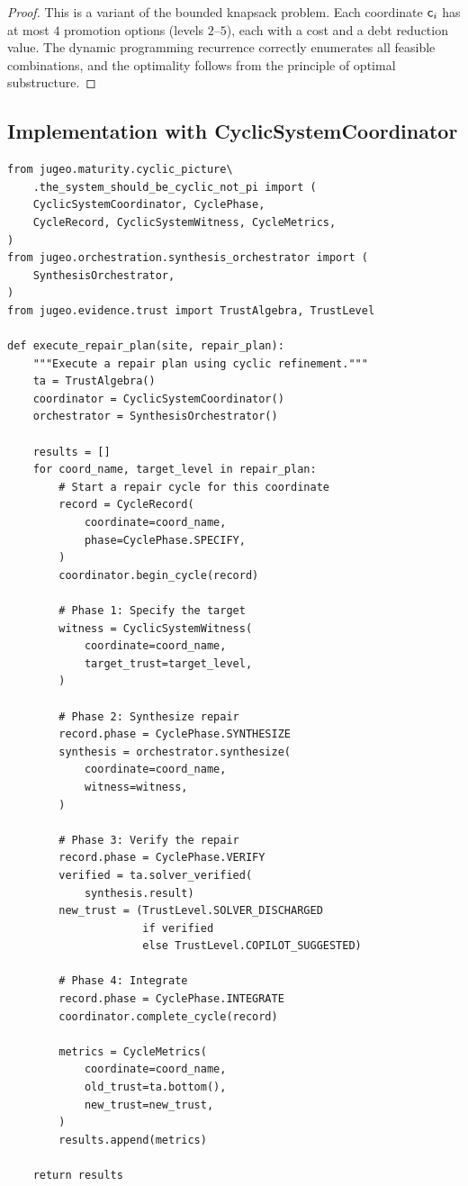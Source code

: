 \documentclass[11pt]{article}
\begin{document}
\begin{proof}
This is a variant of the bounded knapsack problem.  Each coordinate
$\mathsf{c}_i$ has at most $4$ promotion options (levels $2$--$5$), each
with a cost and a debt reduction value.  The dynamic programming
recurrence correctly enumerates all feasible combinations, and the
optimality follows from the principle of optimal substructure.
\end{proof}

\subsection{Implementation with CyclicSystemCoordinator}%
\label{subsec:cyclic-repair}

\begin{lstlisting}[style=jugeo-python]
from jugeo.maturity.cyclic_picture\
    .the_system_should_be_cyclic_not_pi import (
    CyclicSystemCoordinator, CyclePhase,
    CycleRecord, CyclicSystemWitness, CycleMetrics,
)
from jugeo.orchestration.synthesis_orchestrator import (
    SynthesisOrchestrator,
)
from jugeo.evidence.trust import TrustAlgebra, TrustLevel

def execute_repair_plan(site, repair_plan):
    """Execute a repair plan using cyclic refinement."""
    ta = TrustAlgebra()
    coordinator = CyclicSystemCoordinator()
    orchestrator = SynthesisOrchestrator()

    results = []
    for coord_name, target_level in repair_plan:
        # Start a repair cycle for this coordinate
        record = CycleRecord(
            coordinate=coord_name,
            phase=CyclePhase.SPECIFY,
        )
        coordinator.begin_cycle(record)

        # Phase 1: Specify the target
        witness = CyclicSystemWitness(
            coordinate=coord_name,
            target_trust=target_level,
        )

        # Phase 2: Synthesize repair
        record.phase = CyclePhase.SYNTHESIZE
        synthesis = orchestrator.synthesize(
            coordinate=coord_name,
            witness=witness,
        )

        # Phase 3: Verify the repair
        record.phase = CyclePhase.VERIFY
        verified = ta.solver_verified(
            synthesis.result)
        new_trust = (TrustLevel.SOLVER_DISCHARGED
                     if verified
                     else TrustLevel.COPILOT_SUGGESTED)

        # Phase 4: Integrate
        record.phase = CyclePhase.INTEGRATE
        coordinator.complete_cycle(record)

        metrics = CycleMetrics(
            coordinate=coord_name,
            old_trust=ta.bottom(),
            new_trust=new_trust,
        )
        results.append(metrics)

    return results
\end{lstlisting}
\end{document}
